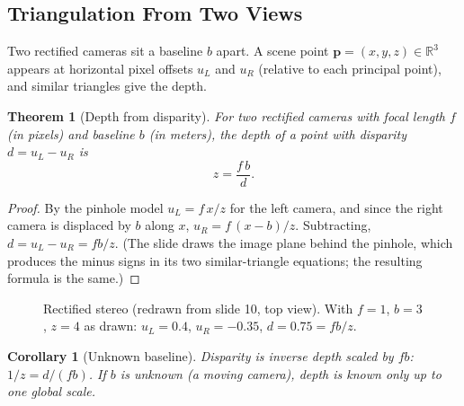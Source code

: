 \documentclass[11pt,a4paper]{article}
\newcommand{\R}{\mathbb{R}}
\theoremstyle{definition}
\theoremstyle{plain}
\newtheorem{theorem}[definition]{Theorem}
\newtheorem{corollary}[definition]{Corollary}
\theoremstyle{remark}
\begin{document}
\subsection{Triangulation From Two Views }
 
Two rectified cameras sit a baseline $b$ apart. A scene point $\bm p=(x,y,z)\in\R^3$ appears at horizontal pixel offsets $u_L$ and $u_R$ (relative to each principal point), and similar triangles give the depth.
 
\begin{theorem}[Depth from disparity]\label{thm:stereo}
For two rectified cameras with focal length $f$ (in pixels) and baseline $b$ (in meters), the depth of a point with disparity $d=u_L-u_R$ is
\[
z=\frac{f\,b}{d}.
\]
\end{theorem}
\begin{proof}
By the pinhole model $u_L=f\,x/z$ for the left camera, and since the right camera is displaced by $b$ along $x$, $u_R=f\,(x-b)/z$. Subtracting, $d=u_L-u_R=fb/z$. (The slide draws the image plane behind the pinhole, which produces the minus signs in its two similar-triangle equations; the resulting formula is the same.) \qedhere
\end{proof}
 
\begin{figure}[htbp]
\centering
{}
\caption{Rectified stereo (redrawn from slide 10, top view). With $f=1$, $b=3$, $z=4$ as drawn: $u_L=0.4$, $u_R=-0.35$, $d=0.75=fb/z$.}
\end{figure}
 
\begin{corollary}[Unknown baseline]\label{cor:unknownb}
Disparity is inverse depth scaled by $fb$: $1/z=d/(fb)$. If $b$ is unknown (a moving camera), depth is known only up to one global scale.
\end{corollary}
 
\end{document}
